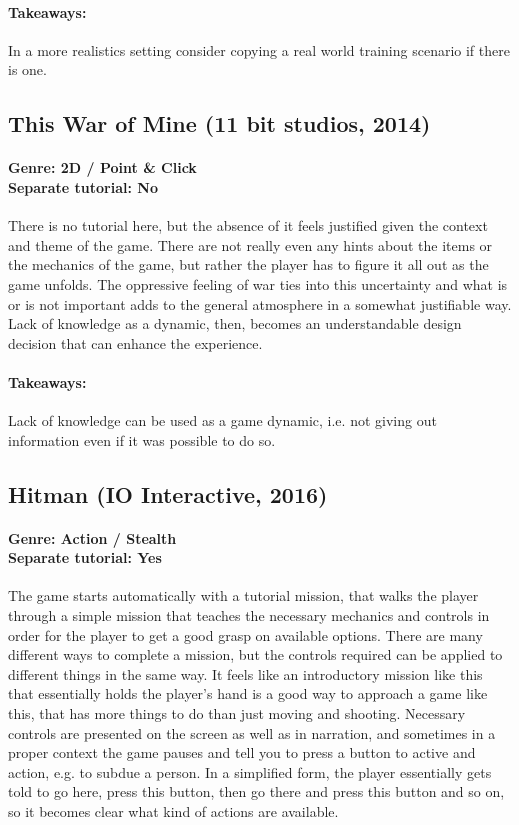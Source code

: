 \paragraph{Takeaways:}
In a more realistics setting consider copying a real world training scenario if there is one.

\subsection{This War of Mine (11 bit studios, 2014)}
\paragraph{Genre: 2D / Point \& Click \\ Separate tutorial: No \\}
There is no tutorial here, but the absence of it feels justified given the context and theme of the game. There are not really even any hints about the items or the mechanics of the game, but rather the player has to figure it all out as the game unfolds. The oppressive feeling of war ties into this uncertainty and what is or is not important adds to the general atmosphere in a somewhat justifiable way. Lack of knowledge as a dynamic, then, becomes an understandable design decision that can enhance the experience.
\paragraph{Takeaways:}
Lack of knowledge can be used as a game dynamic, i.e. not giving out information even if it was possible to do so.

\subsection{Hitman (IO Interactive, 2016)}
\paragraph{Genre: Action / Stealth \\ Separate tutorial: Yes \\}
The game starts automatically with a tutorial mission, that walks the player through a simple mission that teaches the necessary mechanics and controls in order for the player to get a good grasp on available options. There are many different ways to complete a mission, but the controls required can be applied to different things in the same way. It feels like an introductory mission like this that essentially holds the player's hand is a good way to approach a game like this, that has more things to do than just moving and shooting. Necessary controls are presented on the screen as well as in narration, and sometimes in a proper context the game pauses and tell you to press a button to active and action, e.g. to subdue a person. In a simplified form, the player essentially gets told to go here, press this button, then go there and press this button and so on, so it becomes clear what kind of actions are available.
